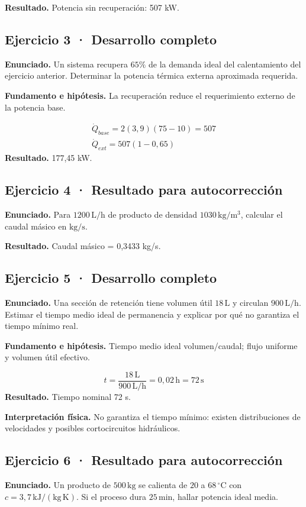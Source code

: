 \documentclass[11pt,a4paper]{article}
\begin{document}
\textbf{Resultado.} Potencia sin recuperación: 507 kW.


\subsection*{Ejercicio 3 · Desarrollo completo}
\textbf{Enunciado.} Un sistema recupera \(65\%\) de la demanda ideal del calentamiento del ejercicio anterior. Determinar la potencia térmica externa aproximada requerida.

\textbf{Fundamento e hipótesis.} La recuperación reduce el requerimiento externo de la potencia base.

\[
\begin{gathered}
\dot Q_{base}=2(3{,}9)(75-10)=507\\\dot Q_{ext}=507(1-0{,}65)
\end{gathered}
\]
\textbf{Resultado.} 177,45 kW.


\subsection*{Ejercicio 4 · Resultado para autocorrección}
\textbf{Enunciado.} Para \(1200\,\mathrm{L/h}\) de producto de densidad \(1030\,\mathrm{kg/m^3}\), calcular el caudal másico en \(\mathrm{kg/s}\).

\textbf{Resultado.} Caudal másico = 0,3433 kg/s.


\subsection*{Ejercicio 5 · Desarrollo completo}
\textbf{Enunciado.} Una sección de retención tiene volumen útil \(18\,\mathrm L\) y circulan \(900\,\mathrm{L/h}\). Estimar el tiempo medio ideal de permanencia y explicar por qué no garantiza el tiempo mínimo real.

\textbf{Fundamento e hipótesis.} Tiempo medio ideal volumen/caudal; flujo uniforme y volumen útil efectivo.

\[
t=\frac{18\,\mathrm L}{900\,\mathrm{L/h}}=0{,}02\,\mathrm h=72\,\mathrm s
\]
\textbf{Resultado.} Tiempo nominal 72 s.

\textbf{Interpretación física.} No garantiza el tiempo mínimo: existen distribuciones de velocidades y posibles cortocircuitos hidráulicos.


\subsection*{Ejercicio 6 · Resultado para autocorrección}
\textbf{Enunciado.} Un producto de \(500\,\mathrm{kg}\) se calienta de \(20\) a \(68\,^\circ\mathrm C\) con \(c=3{,}7\,\mathrm{kJ/(kg\,K)}\). Si el proceso dura \(25\,\mathrm{min}\), hallar potencia ideal media.
\end{document}
